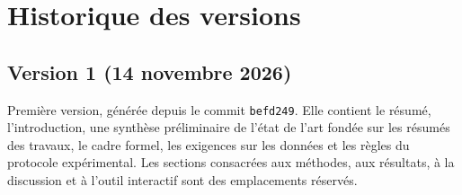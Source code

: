 \section{Historique des versions}\label{ann:historique}
	\subsection{Version 1 (14 novembre 2026)}
		Première version, générée depuis le commit \texttt{befd249}. Elle contient le résumé, l'introduction, une synthèse préliminaire de l'état de l'art fondée sur les résumés des travaux, le cadre formel, les exigences sur les données et les règles du protocole expérimental. Les sections consacrées aux méthodes, aux résultats, à la discussion et à l'outil interactif sont des emplacements réservés.

